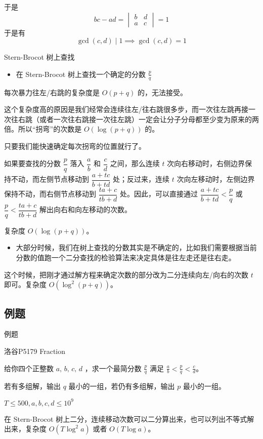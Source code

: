 \documentclass[UTF8]{beamer}
\begin{document}
    \begin{frame}
于是
$$
bc-ad = \begin{vmatrix}
b & d\\
a & c
\end{vmatrix} = 1
$$
于是有
$$
\gcd(c,d)\mid 1\implies \gcd(c,d) = 1
$$
    \end{frame}

    \begin{frame}{Stern-Brocot 树上查找}
        \begin{itemize}
            \item 在 Stern-Brocot 树上查找一个确定的分数 $\frac{p}{q}$
        \end{itemize}
        每次暴力往左/右跳的复杂度是 $O(p+q)$ 的，无法接受。

        这个复杂度高的原因是我们经常会连续往左/往右跳很多步，而一次往左跳再接一次往右跳（或者一次往右跳接一次往左跳）一定会让分子分母都至少变为原来的两倍。所以“拐弯”的次数是 $O(\log (p+q))$ 的。

        只要我们能快速确定每次拐弯的位置就行了。

        \pause

        如果要查找的分数 $\dfrac{p}{q}$ 落入 $\dfrac{a}{b}$ 和 $\dfrac{c}{d}$ 之间，那么连续 $t$ 次向右移动时，右侧边界保持不动，而左侧节点移动到 $\dfrac{a+tc}{b+td}$ 处；反过来，连续 $t$ 次向左移动时，左侧边界保持不动，而右侧节点移动到 $\dfrac{ta+c}{tb+d}$ 处。因此，可以直接通过 $\dfrac{a+tc}{b+td}<\dfrac{p}{q}$ 或 $\dfrac{p}{q}<\dfrac{ta+c}{tb+d}$ 解出向右和向左移动的次数。

        复杂度 $O(\log(p+q))$。
    \end{frame}
    \begin{frame}
        \begin{itemize}
            \item 大部分时候，我们在树上查找的分数其实是不确定的，比如我们需要根据当前分数的值跑一个二分查找的检验算法来决定具体是往左走还是往右走。
        \end{itemize}

        这个时候，把刚才通过解方程来确定次数的部分改为二分连续向左/向右的次数 $t$ 即可。复杂度 $O(\log^2(p+q))$。
    \end{frame}
    \subsection{例题}
    \begin{frame}{例题}
        \begin{block}{洛谷P5179 Fraction}

给你四个正整数 $a,\,b,\,c,\,d$ ，求一个最简分数 $\frac{p}{q}$ 满足 $\frac{a}{b} < \frac{p}{q} < \frac{c}{d}$。

若有多组解，输出 $q$ 最小的一组，若仍有多组解，输出 $p$ 最小的一组。

$T\leqslant 500, a,b,c,d\leqslant 10^9$
        \end{block}
        \pause

        在 Stern-Brocot 树上二分，连续移动次数可以二分算出来，也可以列出不等式解出来，复杂度 $O(T\log^2 a)$ 或者 $O(T\log a)$。
    \end{frame}
\end{document}
